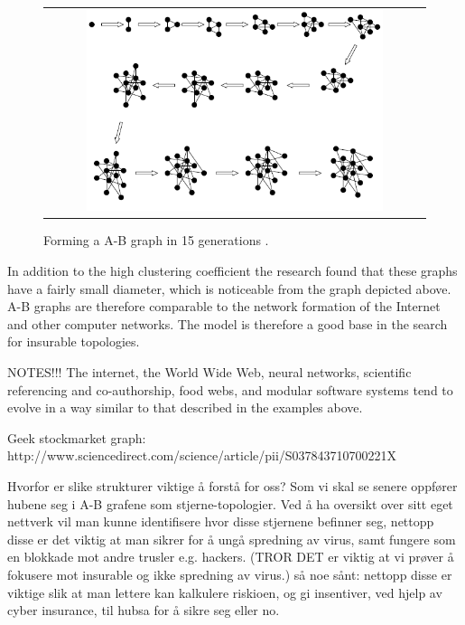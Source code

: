 \begin{figure}[h]
\centering
\begin{tabular}{@{}c@{}}
\includegraphics[width=0.8\textwidth]{../Figures/ABgraphcreation.png}
\end{tabular}
\caption{\label{fig:ABgraphcreation} Forming a A-B graph in 15 generations \cite{audestad}.}
\end{figure}

In addition to the high clustering coefficient the research found that these graphs have a fairly small diameter,
 which is noticeable from the graph depicted above. 
 A-B graphs are therefore comparable to the network formation of the Internet and other computer networks. 
The model is therefore a good base in the search for insurable topologies. 



NOTES!!!
The internet, the World Wide Web, neural networks, scientific referencing and co-authorship, food 
webs, and modular software systems tend to evolve in a way similar to that described in the examples 
above.

Geek stockmarket graph: http://www.sciencedirect.com/science/article/pii/S037843710700221X



Hvorfor er slike strukturer viktige å forstå for oss? 
Som vi skal se senere oppfører hubene seg i A-B grafene som stjerne-topologier. 
Ved å ha oversikt over sitt eget nettverk vil man kunne identifisere hvor disse stjernene befinner seg, nettopp disse er det viktig at man sikrer for å ungå spredning av virus, samt fungere som en blokkade mot andre trusler e.g. hackers. (TROR DET er viktig at vi prøver å fokusere mot insurable og ikke spredning av virus.)
så noe sånt:
nettopp disse er viktige slik at man lettere kan kalkulere riskioen, og gi insentiver, ved hjelp av cyber insurance, til hubsa for å sikre seg eller no.







